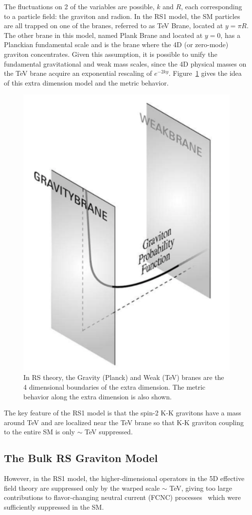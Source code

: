 \vspace{0.3cm}
The fluctuations on 2 of the variables are possible, $k$ and $R$, each corresponding to a particle field: the graviton and radion. In the RS1 model, the SM particles are all trapped on one of the branes, referred to as TeV Brane, located at $y=\pi R$. The other brane in this model, named Plank Brane and located at $y=0$, has a Planckian fundamental scale and is the brane where the 4D (or zero-mode) graviton concentrates. Given this assumption, it is possible to unify the fundamental gravitational and weak mass scales, since the 4D physical masses on the TeV brane acquire an exponential rescaling of $e^{-2ky}$. Figure~\ref{fig:intro_branes} gives the idea of this extra dimension model and the metric behavior.
\begin{figure}[htbp]
\begin{center}
\includegraphics[width=0.32\linewidth]{figures/intro_branes.png}
\caption{In RS theory, the Gravity (Planck) and Weak (TeV) branes are the 4 dimensional boundaries of the extra dimension. The metric behavior along the extra dimension is also shown.}
\label{fig:intro_branes}
\end{center}
\end{figure}

The key feature of the RS1 model is that the spin-2 K-K gravitons have a mass around TeV and are localized near the TeV brane so that K-K graviton coupling to the entire SM is only $\sim$ TeV suppressed.
\subsection{The Bulk RS Graviton Model}
However, in the RS1 model, the higher-dimensional operators in the 5D effective field theory are suppressed only by the warped scale $\sim$ TeV, giving too large contributions to flavor-changing neutral current (FCNC) processes~\cite{intro_rsfcnc1,intro_rsfcnc2} which were sufficiently suppressed in the SM.

